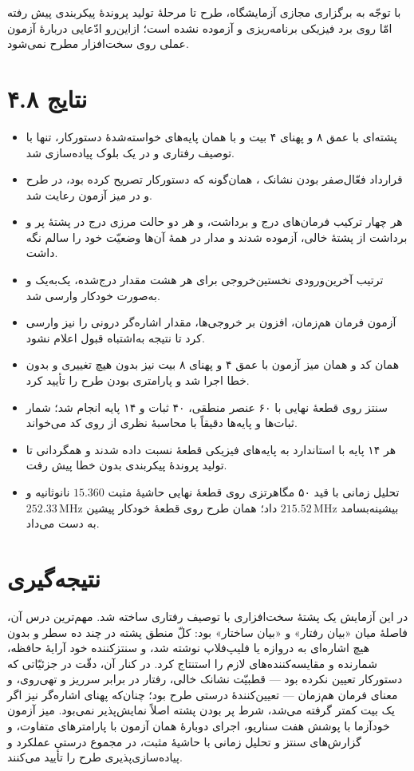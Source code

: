 \documentclass[12pt,a4paper]{article}
\begin{document}
	با توجّه به برگزاری مجازی آزمایشگاه، طرح تا مرحلهٔ تولید پروندهٔ پیکربندی پیش رفته امّا روی برد فیزیکی برنامه‌ریزی و آزموده نشده است؛ ازاین‌رو ادّعایی دربارهٔ آزمون عملی روی سخت‌افزار مطرح نمی‌شود.

	\section*{۴.۸ نتایج}
	\begin{itemize}
		\item پشته‌ای با عمق ۸ و پهنای ۴ بیت و با همان پایه‌های خواسته‌شدهٔ دستورکار، تنها با توصیف رفتاری و در یک بلوک  پیاده‌سازی شد.
		\item قرارداد فعّال‌صفر بودن نشانک ، همان‌گونه که دستورکار تصریح کرده بود، در طرح و در میز آزمون رعایت شد.
		\item هر چهار ترکیب فرمان‌های درج و برداشت، و هر دو حالت مرزی درج در پشتهٔ پر و برداشت از پشتهٔ خالی، آزموده شدند و مدار در همهٔ آن‌ها وضعیّت خود را سالم نگه داشت.
		\item ترتیب آخرین‌ورودی نخستین‌خروجی برای هر هشت مقدار درج‌شده، یک‌به‌یک و به‌صورت خودکار وارسی شد.
		\item آزمون فرمان هم‌زمان، افزون بر خروجی‌ها، مقدار اشاره‌گر درونی را نیز وارسی کرد تا نتیجه به‌اشتباه قبول اعلام نشود.
		\item همان کد و همان میز آزمون با عمق ۴ و پهنای ۸ بیت نیز بدون هیچ تغییری و بدون خطا اجرا شد و پارامتری بودن طرح را تأیید کرد.
		\item سنتز روی قطعهٔ نهایی با ۶۰ عنصر منطقی، ۴۰ ثبات و ۱۴ پایه انجام شد؛ شمار ثبات‌ها و پایه‌ها دقیقاً با محاسبهٔ نظری از روی کد می‌خواند.
		\item هر ۱۴ پایه با استاندارد  به پایه‌های فیزیکی قطعهٔ  نسبت داده شدند و همگردانی تا تولید پروندهٔ پیکربندی بدون خطا پیش رفت.
		\item تحلیل زمانی با قید ۵۰ مگاهرتزی روی قطعهٔ نهایی حاشیهٔ مثبت \(15.360\) نانوثانیه و بیشینه‌بسامد \(215.52\,\mathrm{MHz}\) داد؛ همان طرح روی قطعهٔ خودکار پیشین \(252.33\,\mathrm{MHz}\) به دست می‌داد.
	\end{itemize}

	\section*{نتیجه‌گیری}
	در این آزمایش یک پشتهٔ سخت‌افزاری با توصیف رفتاری ساخته شد. مهم‌ترین درس آن، فاصلهٔ میان «بیان رفتار» و «بیان ساختار» بود: کلّ منطق پشته در چند ده سطر و بدون هیچ اشاره‌ای به دروازه یا فلیپ‌فلاپ نوشته شد، و سنتز‌کننده خود آرایهٔ حافظه، شمارنده و مقایسه‌کننده‌های لازم را استنتاج کرد. در کنار آن، دقّت در جزئیّاتی که دستورکار تعیین نکرده بود — قطبیّت نشانک خالی، رفتار در برابر سرریز و تهی‌روی، و معنای فرمان هم‌زمان — تعیین‌کنندهٔ درستی طرح بود؛ چنان‌که پهنای اشاره‌گر نیز اگر یک بیت کمتر گرفته می‌شد، شرط پر بودن پشته اصلاً نمایش‌پذیر نمی‌بود. میز آزمون خودآزما با پوشش هفت سناریو، اجرای دوبارهٔ همان آزمون با پارامترهای متفاوت، و گزارش‌های سنتز و تحلیل زمانی با حاشیهٔ مثبت، در مجموع درستی عملکرد و پیاده‌سازی‌پذیری طرح را تأیید می‌کنند.
\end{document}

